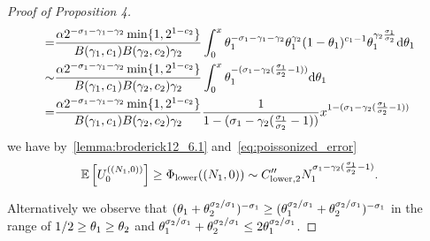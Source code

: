 \begin{proof}[Proof of Proposition 4]
\begin{align*}
    =&\frac{\alpha 2^{-\sigma_{1}-\gamma_{1}-\gamma_{2}}\min\{1, 2^{1-c_{2}}\}}{B(\gamma_{1}, c_{1})B(\gamma_{2}, c_{2})\gamma_{2}}\int_0^x \theta_{1}^{-\sigma_{1}-\gamma_{1}-\gamma_{2}} \theta_{1}^{\gamma_{2}} (1-\theta_{1})^{c_{1}-1} \theta_{1}^{\gamma_{2}\frac{\sigma_{1}}{\sigma_{2}}}\mathrm{d}\theta_{1}\\
    \sim & \frac{\alpha 2^{-\sigma_{1}-\gamma_{1}-\gamma_{2}}\min\{1, 2^{1-c_{2}}\}}{B(\gamma_{1}, c_{1})B(\gamma_{2}, c_{2})\gamma_{2}}\int_0^x \theta_{1}^{-(\sigma_{1}-\gamma_{2}(\frac{\sigma_{1}}{\sigma_{2}}-1))} \mathrm{d}\theta_{1}\\
    =& \frac{\alpha 2^{-\sigma_{1}-\gamma_{1}-\gamma_{2}}\min\{1, 2^{1-c_{2}}\}}{B(\gamma_{1}, c_{1})B(\gamma_{2}, c_{2})\gamma_{2}} \frac{1}{1-(\sigma_{1}-\gamma_{2}(\frac{\sigma_{1}}{\sigma_{2}}-1))}x^{1-(\sigma_{1}-\gamma_{2}(\frac{\sigma_{1}}{\sigma_{2}}-1))}
\end{align*}
we have by~\cref{lemma:broderick12_6.1} and~\cref{eq:poissonized_error}
\begin{equation}
    \E \left[\news{\zerovec}{(\samplesize{1}, 0)}\right]\ge \lowerbound((\samplesize{1},0))\sim \constantlowerwithrateprime{2} \samplesize{1}^{\rate{1}-\corr{2}(\frac{\rate{1}}{\rate{2}}-1)} .
    \label{eq:lowerbound_2l1_pop1_alt1} 
\end{equation}


Alternatively we observe that $(\theta_{1}+\theta_{2}^{\sigma_{2}/\sigma_{1}})^{-\sigma_{1}}\ge (\theta_{1}^{\sigma_{2}/\sigma_{1}}+\theta_{2}^{\sigma_{2}/\sigma_{1}})^{-\sigma_{1}}$ in the range of $1/2 \ge \theta_{1}\ge \theta_{2}$ and $\theta_{1}^{\sigma_{2}/\sigma_{1}}+\theta_{2}^{\sigma_{2}/\sigma_{1}} \le 2 \theta_{1}^{\sigma_{2}/\sigma_{1}}$.


\end{proof}
